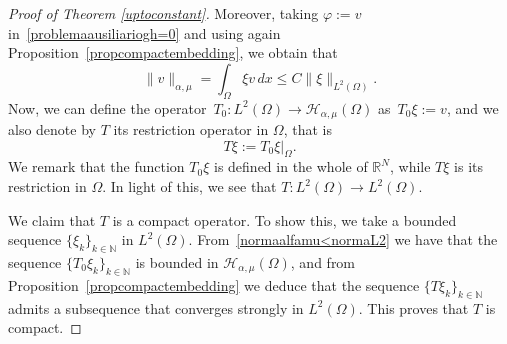 \documentclass[12pt,a4paper,intlimits,sumlimits]{amsart}
\def \N {\mathbb{N}}
\def \R {\mathbb{R}}
\theoremstyle{definition}
\theoremstyle{plain}
\numberwithin{equation}{section}
\renewcommand{\leq}{\leqslant}
\begin{document}
\begin{appendix}
\begin{proof}[Proof of Theorem \ref{uptoconstant}]
Moreover, taking $\varphi:=v$ in~\eqref{problemaausiliariogh=0} and using again Proposition~\ref{propcompactembedding}, we obtain that
\begin{equation}\label{normaalfamu<normaL2}
\|v\|_{\alpha,\mu}=\int_\Omega \xi v\,dx
\leq C\|\xi\|_{L^2(\Omega)}.
\end{equation}
Now, we can define the operator~$T_0:L^2(\Omega)\to \mathcal{H}_{\alpha,\mu}(\Omega)$ as~$T_0 \xi:=v$,
and we also denote by $T$ its restriction operator in $\Omega$,
that is
\[
T \xi:=T_0 \xi\big|_{\Omega}.
\]
We remark that the function $T_0 \xi$ is defined in the whole of 
$\R^N$, while $T\xi$ is its restriction in $\Omega$. In light 
of this, we see that $T:L^2(\Omega) \to L^2(\Omega)$.

We claim that $T$ is a compact operator. To show this, we take a bounded 
sequence $\{\xi_k\}_{k\in \N}$ in $L^2(\Omega)$.
{F}rom~\eqref{normaalfamu<normaL2} we have that the sequence
$\{T_0\xi_k\}_{k\in \N}$ is bounded in $\mathcal{H}_{\alpha,\mu}(\Omega)$,
and from Proposition~\ref{propcompactembedding} we deduce that
the sequence $\{T\xi_k\}_{k\in \N}$ admits a subsequence that 
converges strongly in $L^2(\Omega)$. This proves that $T$ is compact.


\end{proof}
\end{appendix}
\end{document}
